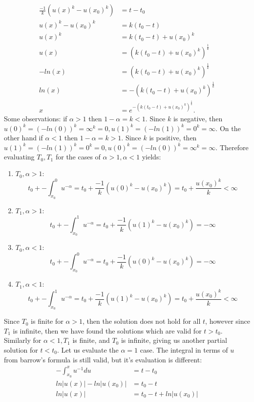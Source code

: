 \documentclass[12pt, letterpaper]{article}
\begin{document}
\begin{enumerate}
\begin{enumerate}
			\begin{align*}
				\frac{-1}{k}(u(x)^{k}-u(x_0)^{k}) &= t - t_0\\
				u(x)^{k}-u(x_0)^{k} &= k(t_0-t)\\
				u(x)^k &= k(t_0-t) + u(x_0)^{k}\\
				u(x) &= (k(t_0-t) + u(x_0)^{k})^\frac{1}{k}\\
				-ln(x) &= (k(t_0-t) + u(x_0)^{k})^\frac{1}{k}\\
				ln(x) &= -(k(t_0-t) + u(x_0)^{k})^\frac{1}{k}\\
				x &= e^{-(k(t_0-t) + u(x_0)^{k})^\frac{1}{k}}.
			\end{align*}
			Some observations:  if $\alpha > 1$ then $1-\alpha = k < 1$.  Since $k$ is negative, then $u(0)^k = (-ln(0))^k = \infty^k = 0, u(1)^k = (-ln(1))^k = 0^k = \infty$.  On the other hand if $\alpha < 1$ then $1-\alpha = k > 1$.  Since $k$ is positive, then $u(1)^k = (-ln(1))^k = 0^k = 0, u(0)^k = (-ln(0))^k = \infty^k = \infty$.  Therefore evaluating $T_0, T_1$ for the cases of $\alpha >1, \alpha < 1$ yields:
			\begin{enumerate}
				\item $T_0, \alpha > 1$: $$t_0 + -\int_{x_0}^0 u^{-\alpha} = t_0 + \frac{-1}{k}(u(0)^{k}-u(x_0)^{k}) = t_0 + \frac{u(x_0)^{k}}{k} < \infty$$
				\item $T_1, \alpha > 1$: $$t_0 + -\int_{x_0}^1 u^{-\alpha} = t_0 + \frac{-1}{k}(u(1)^{k}-u(x_0)^{k}) =  -\infty$$
				\item $T_0, \alpha < 1$: $$t_0 + -\int_{x_0}^0 u^{-\alpha} = t_0 + \frac{-1}{k}(u(0)^{k}-u(x_0)^{k}) =  -\infty$$
				\item $T_1, \alpha < 1$: $$t_0 + -\int_{x_0}^1 u^{-\alpha} = t_0 + \frac{-1}{k}(u(1)^{k}-u(x_0)^{k}) = t_0 + \frac{u(x_0)^{k}}{k} < \infty$$
\end{enumerate}			 
			Since $T_0$ is finite for $\alpha > 1$, then the solution does not hold for all $t$, however since $T_1$ is infinite, then we have found the solutions which are valid for $t>t_0$.  Similarly for $\alpha < 1, T_1$ is finite, and $T_0$ is infinite, giving us another partial solution for $t < t_0$. Let us evaluate the $\alpha = 1$ case.  The integral in terms of $u$ from barrow's formula is still valid, but it's evaluation is different:
			\begin{align*}
				-\int_{x_0}^x u^{-1}du &= t-t_0\\
				ln|u(x)| - ln|u(x_0)| &= t_0-t\\
				ln|u(x)| & = t_0 -t + ln|u(x_0)|\\

\end{align*}
\end{enumerate}
\end{enumerate}
\end{document}
